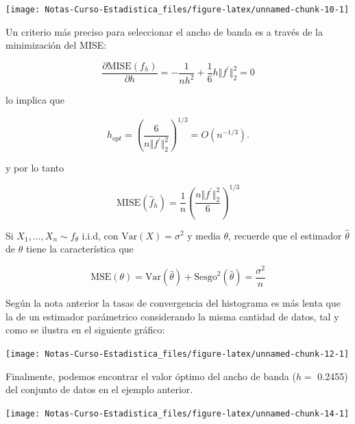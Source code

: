 \documentclass[
  12pt,
]{book}
\begin{document}
\begin{center}\texttt{[image: Notas-Curso-Estadistica\_files/figure-latex/unnamed-chunk-10-1]} \end{center}

Un criterio más preciso para seleccionar el ancho de banda es a través
de la minimización del MISE:

\begin{equation*}
\frac{\partial \mathrm{MISE}(f_{h})}{\partial h} = -\frac{1}{nh^2} + \frac{1}{6} h \Vert f^\prime\Vert_{2}^2 = 0
\end{equation*}

lo implica que

\begin{equation*}
h_{opt} = \left(\frac{6}{n\Vert f^\prime\Vert_{2}^2}\right) ^{1/3} = O\left( n^{-1/3} \right).
\end{equation*}

y por lo tanto

\begin{equation*}
\mathrm{MISE}(\hat{f}_{h}) = \frac{1}{n} \left(\frac{n\Vert f^\prime\Vert_{2}^2}{6}\right)  ^{1/3}
\end{equation*}

Si \(X_1, \ldots, X_n \sim f_{\theta}\) i.i.d, con
\(\mathrm{Var}(X) = \sigma^2\) y media \(\theta\), recuerde que el
estimador \(\hat{\theta}\) de \(\theta\) tiene la característica que

\begin{equation*}
\mathrm{MSE}(\theta) = \mathrm{Var}(\hat{\theta}) +
\mathrm{Sesgo}^2(\hat{\theta}) = \frac{\sigma^2}{n}
\end{equation*}

Según la nota anterior la tasas de convergencia del histograma es más
lenta que la de un estimador parámetrico considerando la misma cantidad
de datos, tal y como se ilustra en el siguiente gráfico:

\begin{center}\texttt{[image: Notas-Curso-Estadistica\_files/figure-latex/unnamed-chunk-12-1]} \end{center}

Finalmente, podemos encontrar el valor óptimo del ancho de banda (\(h=\)
0.2455) del conjunto de datos en el ejemplo anterior.

\begin{center}\texttt{[image: Notas-Curso-Estadistica\_files/figure-latex/unnamed-chunk-14-1]} \end{center}
\end{document}
